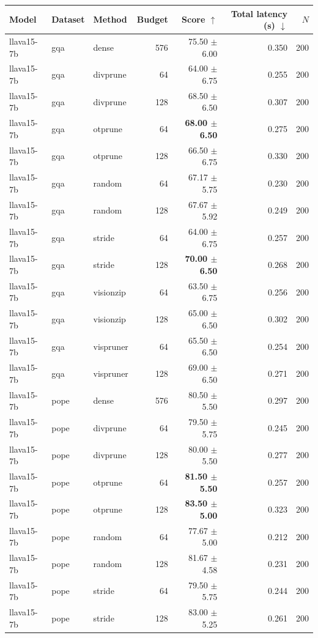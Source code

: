 \begin{tabular}{lllrrrr}
\toprule
Model & Dataset & Method & Budget & Score $\uparrow$ & Total latency (s) $\downarrow$ & $N$ \\
\midrule
llava15-7b & gqa & dense & 576 & 75.50 $\pm$ 6.00 & 0.350 & 200 \\
llava15-7b & gqa & divprune & 64 & 64.00 $\pm$ 6.75 & 0.255 & 200 \\
llava15-7b & gqa & divprune & 128 & 68.50 $\pm$ 6.50 & 0.307 & 200 \\
llava15-7b & gqa & otprune & 64 & \textbf{68.00 $\pm$ 6.50} & 0.275 & 200 \\
llava15-7b & gqa & otprune & 128 & 66.50 $\pm$ 6.75 & 0.330 & 200 \\
llava15-7b & gqa & random & 64 & 67.17 $\pm$ 5.75 & 0.230 & 200 \\
llava15-7b & gqa & random & 128 & 67.67 $\pm$ 5.92 & 0.249 & 200 \\
llava15-7b & gqa & stride & 64 & 64.00 $\pm$ 6.75 & 0.257 & 200 \\
llava15-7b & gqa & stride & 128 & \textbf{70.00 $\pm$ 6.50} & 0.268 & 200 \\
llava15-7b & gqa & visionzip & 64 & 63.50 $\pm$ 6.75 & 0.256 & 200 \\
llava15-7b & gqa & visionzip & 128 & 65.00 $\pm$ 6.50 & 0.302 & 200 \\
llava15-7b & gqa & vispruner & 64 & 65.50 $\pm$ 6.50 & 0.254 & 200 \\
llava15-7b & gqa & vispruner & 128 & 69.00 $\pm$ 6.50 & 0.271 & 200 \\
llava15-7b & pope & dense & 576 & 80.50 $\pm$ 5.50 & 0.297 & 200 \\
llava15-7b & pope & divprune & 64 & 79.50 $\pm$ 5.75 & 0.245 & 200 \\
llava15-7b & pope & divprune & 128 & 80.00 $\pm$ 5.50 & 0.277 & 200 \\
llava15-7b & pope & otprune & 64 & \textbf{81.50 $\pm$ 5.50} & 0.257 & 200 \\
llava15-7b & pope & otprune & 128 & \textbf{83.50 $\pm$ 5.00} & 0.323 & 200 \\
llava15-7b & pope & random & 64 & 77.67 $\pm$ 5.00 & 0.212 & 200 \\
llava15-7b & pope & random & 128 & 81.67 $\pm$ 4.58 & 0.231 & 200 \\
llava15-7b & pope & stride & 64 & 79.50 $\pm$ 5.75 & 0.244 & 200 \\
llava15-7b & pope & stride & 128 & 83.00 $\pm$ 5.25 & 0.261 & 200 \\

\end{tabular}
